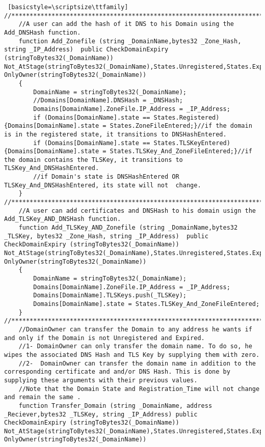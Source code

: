 \begin{lstlisting} [basicstyle=\scriptsize\ttfamily]
//************************************************************************************************************************//
    //A user can add the hash of it DNS to his Domain using the Add_DNSHash function.
    function Add_Zonefile (string _DomainName,bytes32 _Zone_Hash, string _IP_Address)  public CheckDomainExpiry (stringToBytes32(_DomainName)) Not_AtStage(stringToBytes32(_DomainName),States.Unregistered,States.Expired) OnlyOwner(stringToBytes32(_DomainName))
    {
        DomainName = stringToBytes32(_DomainName);
        //Domains[DomainName].DNSHash = _DNSHash;
        Domains[DomainName].ZoneFile.IP_Address = _IP_Address;
        if (Domains[DomainName].state == States.Registered) {Domains[DomainName].state = States.ZoneFileEntered;}//if the domain is in the registered state, it transitions to DNSHashEntered.
        if (Domains[DomainName].state == States.TLSKeyEntered) {Domains[DomainName].state = States.TLSKey_And_ZoneFileEntered;}//if the domain contains the TLSKey, it transitions to TLSKey_And_DNSHashEntered.
        //if Domain's state is DNSHashEntered OR TLSKey_And_DNSHashEntered, its state will not  change.
    }
//************************************************************************************************************************//
    //A user can add certificates and DNSHash to his domain usign the Add_TLSKey_AND_DNSHash function.
    function Add_TLSKey_AND_Zonefile (string _DomainName,bytes32 _TLSKey, bytes32 _Zone_Hash, string _IP_Address)  public CheckDomainExpiry (stringToBytes32(_DomainName)) Not_AtStage(stringToBytes32(_DomainName),States.Unregistered,States.Expired) OnlyOwner(stringToBytes32(_DomainName))
    {
        DomainName = stringToBytes32(_DomainName);
        Domains[DomainName].ZoneFile.IP_Address = _IP_Address;
        Domains[DomainName].TLSKeys.push(_TLSKey);
        Domains[DomainName].state = States.TLSKey_And_ZoneFileEntered;
    }
//************************************************************************************************************************//
    //DomainOwner can transfer the Domain to any address he wants if and only if the Domain is not Unregistered and Expired.
    //1- DomainOwner can only transfer the domain name. To do so, he wipes the associated DNS Hash and TLS Key by supplying them with zero.
    //2-  DomainOwner can transfer the domain name in addition to the corresponding certificate and and/or DNS Hash. This is done by supplying these arguments with their previous values.
    //Note that the Domain State and Registration_Time will not change and remain the same .
    function Transfer_Domain (string _DomainName, address _Reciever,bytes32 _TLSKey, string _IP_Address) public CheckDomainExpiry (stringToBytes32(_DomainName)) Not_AtStage(stringToBytes32(_DomainName),States.Unregistered,States.Expired) OnlyOwner(stringToBytes32(_DomainName))

\end{lstlisting}
